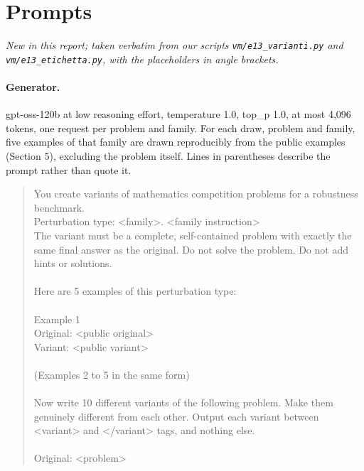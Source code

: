 \section{Prompts}\label{app:I}
\emph{New in this report; taken verbatim from our scripts \texttt{vm/e13\_varianti.py} and \texttt{vm/e13\_etichetta.py}, with the placeholders in angle brackets.}

\paragraph{Generator.} gpt-oss-120b at low reasoning effort, temperature 1.0, top\_p 1.0, at most 4,096 tokens, one request per problem and family. For each draw, problem and family, five examples of that family are drawn reproducibly from the public examples (Section 5), excluding the problem itself. Lines in parentheses describe the prompt rather than quote it.

\begin{quote}\footnotesize\ttfamily
You create variants of mathematics competition problems for a robustness benchmark. \\
Perturbation type: <family>. <family instruction> \\
The variant must be a complete, self-contained problem with exactly the same final answer as the original. Do not solve the problem. Do not add hints or solutions. \\
~ \\
Here are 5 examples of this perturbation type: \\
~ \\
Example 1 \\
Original: <public original> \\
Variant: <public variant> \\
~ \\
(Examples 2 to 5 in the same form) \\
~ \\
Now write 10 different variants of the following problem. Make them genuinely different from each other. Output each variant between <variant> and </variant> tags, and nothing else. \\
~ \\
Original: <problem>
\end{quote}

